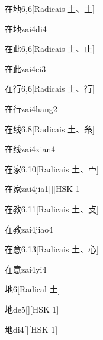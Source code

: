 \begin{entry}{在地}{6,6}[Radicais ⼟、⼟]
  \begin{phonetics}{在地}{zai4di4}
  \end{phonetics}
\end{entry}

\begin{entry}{在此}{6,6}[Radicais ⼟、⽌]
  \begin{phonetics}{在此}{zai4ci3}
  \end{phonetics}
\end{entry}

\begin{entry}{在行}{6,6}[Radicais ⼟、⾏]
  \begin{phonetics}{在行}{zai4hang2}
  \end{phonetics}
\end{entry}

\begin{entry}{在线}{6,8}[Radicais ⼟、⽷]
  \begin{phonetics}{在线}{zai4xian4}
  \end{phonetics}
\end{entry}

\begin{entry}{在家}{6,10}[Radicais ⼟、⼧]
  \begin{phonetics}{在家}{zai4jia1}[][HSK 1]
  \end{phonetics}
\end{entry}

\begin{entry}{在教}{6,11}[Radicais ⼟、⽁]
  \begin{phonetics}{在教}{zai4jiao4}
  \end{phonetics}
\end{entry}

\begin{entry}{在意}{6,13}[Radicais ⼟、⼼]
  \begin{phonetics}{在意}{zai4yi4}
  \end{phonetics}
\end{entry}

\begin{entry}{地}{6}[Radical ⼟]
  \begin{phonetics}{地}{de5}[][HSK 1]
  \end{phonetics}
  \begin{phonetics}{地}{di4}[][HSK 1]
  \end{phonetics}
\end{entry}

